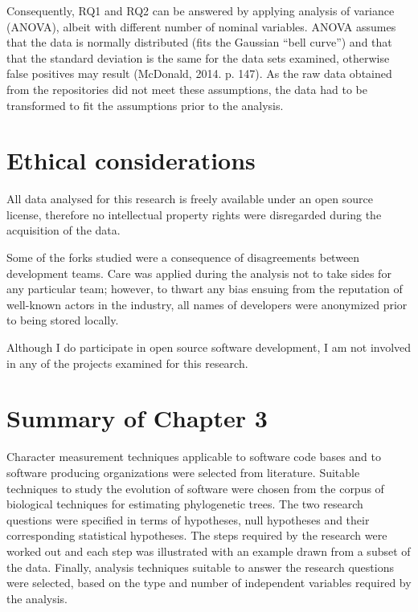 Consequently, RQ1 and RQ2 can be answered by applying analysis of variance (ANOVA), albeit with different number of nominal variables. ANOVA assumes that the data is normally distributed (fits the Gaussian “bell curve”) and that that the standard deviation is the same for the data sets examined, otherwise false positives may result (McDonald, 2014. p. 147). As the raw data obtained from the repositories did not meet these assumptions, the data had to be transformed to fit the assumptions prior to the analysis.

\section{Ethical considerations}
All data analysed for this research is freely available under an open source license, therefore no intellectual property rights were disregarded during the acquisition of the data. 

Some of the forks studied were a consequence of disagreements between development teams. Care was applied during the analysis not to take sides for any particular team; however, to thwart any bias ensuing from the reputation of well-known actors in the industry, all names of developers were anonymized prior to being stored locally.

Although I do participate in open source software development, I am not involved in any of the projects examined for this research.
\section{Summary of Chapter 3}
Character measurement techniques applicable to software code bases and to software producing organizations were selected from literature. Suitable techniques to study the evolution of software were chosen from the corpus of biological techniques for estimating phylogenetic trees. The two research questions were specified in terms of hypotheses, null hypotheses and their corresponding statistical hypotheses. The steps required by the research were worked out and each step was illustrated with an example drawn from a subset of the data. Finally, analysis techniques suitable to answer the research questions were selected, based on the type and number of independent variables required by the analysis.


